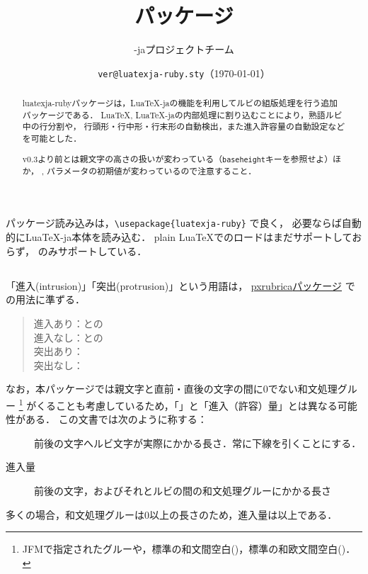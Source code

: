 \documentclass[a4paper,10ptj]{ltjsarticle}
\title{\Pkg{luatexja-ruby}パッケージ}
\author{\LuaTeX-jaプロジェクトチーム}
\date{\texttt{\csname ver@luatexja-ruby.sty\endcsname}（\today）}
\def\emph#1{\textbf{\textgt{#1}}}
\def\Pkg#1{\texorpdfstring{\textsf{#1}}{#1}} %
\def\LuaTeX{Lua\TeX}
\begin{document}
\protected{}

\maketitle

\begin{abstract}
\Pkg{luatexja-ruby}パッケージは，\LuaTeX-jaの機能を利用してルビの組版処理を行う追加パッケージである．
\LuaTeX, \LuaTeX-jaの内部処理に割り込むことにより，熟語ルビ中の行分割や，
行頭形・行中形・行末形の自動検出，また進入許容量の自動設定などを可能とした．

v0.3より前とは親文字の高さの扱いが変わっている（\texttt{baseheight}キーを参照せよ）ほか，
, パラメータの初期値が変わっているので注意すること．
\end{abstract}

\tableofcontents

\newpage
\section[利用方法]{}
パッケージ読み込みは，\verb+\usepackage{luatexja-ruby}+ で良く，
必要ならば自動的に\LuaTeX-ja本体を読み込む．
plain \LuaTeX でのロードはまだサポートしておらず，
\LaTeXe のみサポートしている．

\subsection[用語]{}
「進入(intrusion)」「突出(protrusion)」という用語は，
\href{http://zrbabbler.sp.land.to/pxrubrica.html}{\Pkg{pxrubrica}パッケージ}%
での用法に準ずる．

\begin{quote}
  進入あり：との\\
  進入なし：との\\
  突出あり：\\
  突出なし：
\end{quote}

なお，本パッケージでは親文字と直前・直後の文字の間に0でない和文処理グルー
\footnote{JFMで指定されたグルーや，標準の和文間空白()，標準の和欧文間空白()．}%
がくることも考慮しているため，「\emph{前後の文字への}」と「進入（許容）量」とは異なる可能性がある．
この文書では次のように称する：
\begin{description}
  \item[] 前後の文字へルビ文字が実際にかかる長さ．常に下線を引くことにする．
  \item[進入量] 前後の文字，およびそれとルビの間の和文処理グルーにかかる長さ
\end{description}
多くの場合，和文処理グルーは0以上の長さのため，進入量は以上である．
\end{document}

